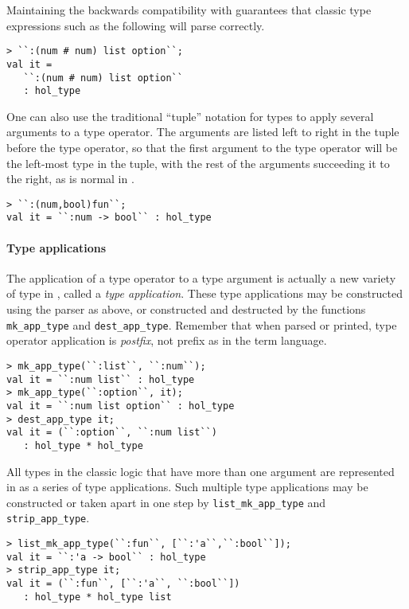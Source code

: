 Maintaining the backwards compatibility with \HOL{} guarantees that
classic type expressions such as the following will parse correctly.
%
\begin{session}
\begin{verbatim}
> ``:(num # num) list option``;
val it =
   ``:(num # num) list option``
   : hol_type
\end{verbatim}
\end{session}

One can also use the traditional ``tuple'' notation for types
to apply several arguments to a type operator.
The arguments are listed
left to right
in the tuple before the type operator,
so that the first argument to the type operator will
be the left-most type in the tuple, with the rest of the arguments succeeding
it to the right, as is normal in \HOL.
%
\begin{session}
\begin{verbatim}
> ``:(num,bool)fun``;
val it = ``:num -> bool`` : hol_type
\end{verbatim}
\end{session}

\paragraph{Type applications}

The application of a type operator to a type argument is actually a new
variety of type in \HOL{}, called a {\it type application}.  These type
applications may be constructed using the parser as above, or constructed and
destructed by the \ML{} functions \texttt{mk\_app\_type} and
\texttt{dest\_app\_type}.
Remember that when parsed or printed, type operator application is {\it postfix}, not prefix as in the term language.
%
\begin{session}
\begin{verbatim}
> mk_app_type(``:list``, ``:num``);
val it = ``:num list`` : hol_type
> mk_app_type(``:option``, it);
val it = ``:num list option`` : hol_type
> dest_app_type it;
val it = (``:option``, ``:num list``)
   : hol_type * hol_type
\end{verbatim}
\end{session}

All types in the classic \HOL{} logic that have more than one argument
are represented in \HOLW{} as a series of type applications.  Such multiple
type applications may be constructed or taken apart in one step by
\texttt{list\_mk\_app\_type} and \texttt{strip\_app\_type}.
%
\begin{session}
\begin{verbatim}
> list_mk_app_type(``:fun``, [``:'a``,``:bool``]);
val it = ``:'a -> bool`` : hol_type
> strip_app_type it;
val it = (``:fun``, [``:'a``, ``:bool``])
   : hol_type * hol_type list
\end{verbatim}
\end{session}


